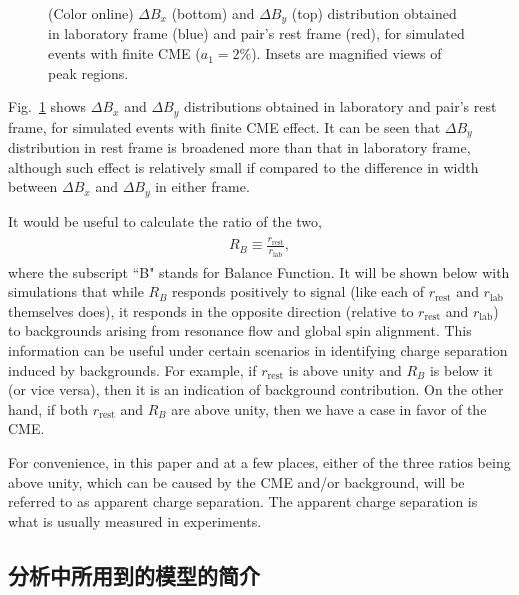 \begin{figure}[htbp]
\centering
{}
\caption{(Color online) $\Delta B_x$ (bottom) and $\Delta B_y$ (top) distribution obtained in laboratory frame (blue) and pair's rest frame (red), for simulated events with finite CME ($a_1 = 2\%$). Insets are magnified views of peak regions. }
\label{fig:BFHisto_rest_lab_example}
\end{figure}

Fig.~\ref{fig:BFHisto_rest_lab_example} shows $\Delta B_x$ and $\Delta B_y$ distributions obtained in laboratory and pair's rest frame, for simulated events with finite CME effect. It can be seen that $\Delta B_y$ distribution in rest frame is broadened  more than that in laboratory frame, although such effect is relatively small if compared to the difference in width between $\Delta B_x$ and $\Delta B_y$ in either frame.

It would be useful to calculate the ratio of the two,
\begin{eqnarray}
\begin{aligned}
R_{B} \equiv  \frac{r_{\mathrm{rest}}}{r_{\mathrm{lab}}},
\end{aligned}
\label{eq:R_B}
\end{eqnarray}
where the subscript ``B" stands for Balance Function.
It will be shown below with simulations that while $R_{B}$
responds positively to signal (like each of $r_{\mathrm{rest}}$ and $r_{\mathrm{lab}}$ themselves does), it responds in the opposite direction (relative to $r_{\mathrm{rest}}$  and $r_{\mathrm{lab}}$) to backgrounds arising from resonance flow and global spin alignment. This information can be useful under certain scenarios in identifying charge separation induced by backgrounds. For example, if $r_{\mathrm{rest}}$ is above unity and $R_{B}$ is below it (or vice versa), then it is an indication of background contribution. On the other hand, if both $r_{\mathrm{rest}}$ and $R_{B}$ are above unity, then we have a case in favor of the CME.
 
For convenience, in this paper and at a few places, either of the three ratios being above unity, which can be caused by the CME and/or background, will be referred to as apparent charge separation. The apparent charge separation is what is usually measured in experiments.





\subsection{分析中所用到的模型的简介}

